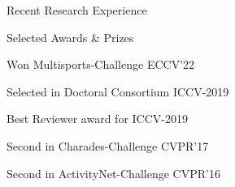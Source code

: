 \documentclass{resume} %
\begin{document}
\begin{paracol}{2}
\begin{rSection}{Recent Research Experience}{}
\end{rSection}

\switchcolumn
\begin{rSection}{Selected Awards \& Prizes}{}
\begin{sSubsection}{Won Multisports-Challenge ECCV'22}\end{sSubsection} %
\begin{sSubsection}{Selected in Doctoral Consortium ICCV-2019}\end{sSubsection}  %
\begin{sSubsection}{Best Reviewer award for ICCV-2019}\end{sSubsection} %
\begin{sSubsection}{Second in Charades-Challenge CVPR'17}\end{sSubsection} %
\begin{sSubsection}{Second in ActivityNet-Challenge CVPR'16}\end{sSubsection} %
\end{rSection}


\end{paracol}
\end{document}
